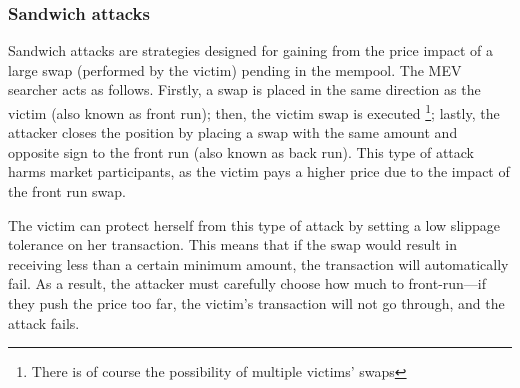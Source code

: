 \documentclass[a4paper,11pt]{article}
\begin{document}


\subsubsection{Sandwich attacks}
Sandwich attacks are strategies designed for gaining from the price impact of a large swap (performed by the victim) pending in the mempool. The MEV searcher acts as follows. Firstly, a swap is placed in the same direction as the victim (also known as front run); then, the victim swap is executed \footnote{There is of course the possibility of multiple victims' swaps}; lastly, the attacker closes the position by placing a swap with the same amount and opposite sign to the front run (also known as back run). This type of attack harms market participants, as the victim pays a higher price due to the impact of the front run swap.

The victim can protect herself from this type of attack by setting a low slippage tolerance on her transaction. This means that if the swap would result in receiving less than a certain minimum amount, the transaction will automatically fail. As a result, the attacker must carefully choose how much to front-run—if they push the price too far, the victim’s transaction will not go through, and the attack fails.
\end{document}
